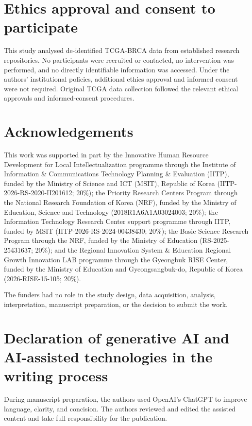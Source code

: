 \documentclass[pdflatex]{cas-dc}
\theoremstyle{remark}
\theoremstyle{plain}
\begin{document}
\section*{Ethics approval and consent to participate}

This study analysed de-identified TCGA-BRCA data from established research repositories. No participants were recruited or contacted, no intervention was performed, and no directly identifiable information was accessed. Under the authors' institutional policies, additional ethics approval and informed consent were not required. Original TCGA data collection followed the relevant ethical approvals and informed-consent procedures.


\section*{Acknowledgements}

This work was supported in part by the Innovative Human Resource Development for Local Intellectualization programme through the Institute of Information \& Communications Technology Planning \& Evaluation (IITP), funded by the Ministry of Science and ICT (MSIT), Republic of Korea (IITP-2026-RS-2020-II201612; 20\%); the Priority Research Centers Program through the National Research Foundation of Korea (NRF), funded by the Ministry of Education, Science and Technology (2018R1A6A1A03024003; 20\%); the Information Technology Research Center support programme through IITP, funded by MSIT (IITP-2026-RS-2024-00438430; 20\%); the Basic Science Research Program through the NRF, funded by the Ministry of Education (RS-2025-25431637; 20\%); and the Regional Innovation System \& Education Regional Growth Innovation LAB programme through the Gyeongbuk RISE Center, funded by the Ministry of Education and Gyeongsangbuk-do, Republic of Korea (2026-RISE-15-105; 20\%).

The funders had no role in the study design, data acquisition, analysis, interpretation, manuscript preparation, or the decision to submit the work.


\section*{Declaration of generative AI and AI-assisted technologies in the writing process}

During manuscript preparation, the authors used OpenAI's ChatGPT to improve language, clarity, and concision. The authors reviewed and edited the assisted content and take full responsibility for the publication.
\end{document}
